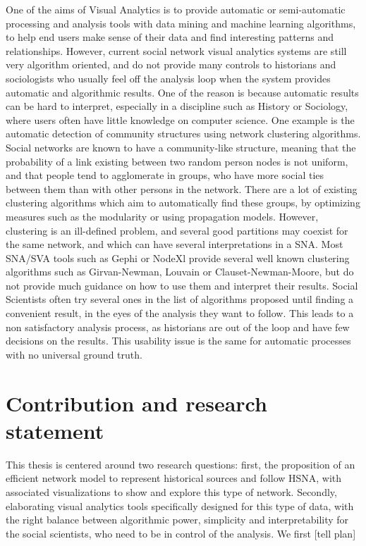 One of the aims of Visual Analytics is to provide automatic or semi-automatic processing and analysis tools with data mining and machine learning algorithms, to help end users make sense of their data and find interesting patterns and relationships.
However, current social network visual analytics systems are still very algorithm oriented, and do not provide many controls to historians and sociologists who usually feel off the analysis loop when the system provides automatic and algorithmic results. One of the reason is because automatic results can be hard to interpret, especially in a discipline such as History or Sociology, where users often have little knowledge on computer science.
One example is the automatic detection of community structures using network clustering algorithms. Social networks are known to have a community-like structure, meaning that the probability of a link existing between two random person nodes is not uniform, and that people tend to agglomerate in groups, who have more social ties between them than with other persons in the network.
There are a lot of existing clustering algorithms which aim to automatically find these groups, by optimizing measures such as the modularity or using propagation models.
However, clustering is an ill-defined problem, and several good partitions may coexist for the same network, and which can have several interpretations in a SNA. Most SNA/SVA tools such as Gephi or NodeXl provide several well known clustering algorithms such as Girvan-Newman, Louvain or Clauset-Newman-Moore, but do not provide much guidance on how to use them and interpret their results.
Social Scientists often try several ones in the list of algorithms proposed until finding a convenient result, in the eyes of the analysis they want to follow.
This leads to a non satisfactory analysis process, as historians are out of the loop and have few decisions on the results. This usability issue is the same for automatic processes with no universal ground truth.

\section{Contribution and research statement}

This thesis is centered around two research questions: first, the proposition of an efficient network model to represent historical sources and follow HSNA, with associated visualizations to show and explore this type of network. Secondly, elaborating visual analytics tools specifically designed for this type of data, with the right balance between algorithmic power, simplicity and interpretability for the social scientists, who need to be in control of the analysis. We first [tell plan]
